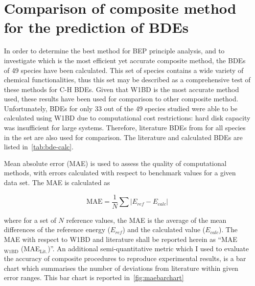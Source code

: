 \section{Comparison of composite method for the prediction of BDEs}
In order to determine the best method for BEP principle analysis, and to investigate which is the most efficient yet accurate composite method, the BDEs of 49 species have been calculated. This set of species contains a wide variety of chemical functionalities, thus this set may be described as a comprehensive test of these methods for C-H BDEs. Given that W1BD is the most accurate method used, these results have been used for comparison to other composite method. Unfortunately, BDEs for only 33 out of the 49 species studied were able to be calculated using W1BD due to computational cost restrictions: hard disk capacity was insufficient for large systems. Therefore, literature BDEs from \citet{Luo2002} for all species in the set are also used for comparison. The literature and calculated BDEs are listed in~\ref{tab:bde-calc}.

\begin{landscape}

\end{landscape}

Mean absolute error (MAE) is used to assess the quality of computational methods, with errors calculated with respect to benchmark values for a given data set.\cite{Savin2014} The MAE is calculated as

\begin{equation}
  \mathrm{MAE} = \frac{1}{N} \sum | E_{ref} - E_{calc}|
\end{equation}

\noindent where for a set of $N$ reference values, the MAE is the average of the mean differences of the reference energy ($E_{ref}$) and the calculated value ($E_{calc}$). The MAE with respect to W1BD and literature shall be reported herein as ``MAE$_{\mathrm{W1BD}}$ (MAE$_{\mathrm{Lit.}}$)''. An additional semi-quantitative metric which I used to evaluate the accuracy of composite procedures to reproduce experimental results, is a bar chart which summarises the number of deviations from literature within given error ranges. This bar chart is reported in~\ref{fig:maebarchart}

